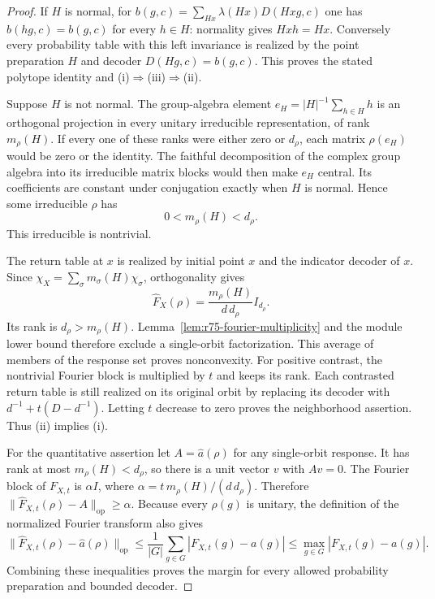 \begin{proof}
If $H$ is normal, for
$b(g,c)=\sum_{Hx}\lambda(Hx)D(Hxg,c)$ one has
$b(hg,c)=b(g,c)$ for every $h\in H$: normality gives $Hxh=Hx$.
Conversely every probability table with this left invariance is
realized by the point preparation $H$ and decoder
$D(Hg,c)=b(g,c)$. This proves the stated polytope identity and
(i)$\Rightarrow$(iii)$\Rightarrow$(ii).

Suppose $H$ is not normal. The group-algebra element
$e_H=|H|^{-1}\sum_{h\in H}h$ is an orthogonal projection in every
unitary irreducible representation, of rank $m_\rho(H)$. If every one
of these ranks were either zero or $d_\rho$, each matrix $\rho(e_H)$
would be zero or the identity. The faithful decomposition of the
complex group algebra into its irreducible matrix blocks would then
make $e_H$ central. Its coefficients are constant under conjugation
exactly when $H$ is normal. Hence some irreducible $\rho$ has
\[
 0<m_\rho(H)<d_\rho.
\]
This irreducible is nontrivial.

The return table at $x$ is realized by initial point $x$ and the
indicator decoder of $x$. Since
$\chi_X=\sum_\sigma m_\sigma(H)\chi_\sigma$, orthogonality gives
\[
 \widehat F_X(\rho)=\frac{m_\rho(H)}{d\,d_\rho}I_{d_\rho}.
\]
Its rank is $d_\rho>m_\rho(H)$. Lemma~\ref{lem:r75-fourier-multiplicity}
and the module lower bound therefore exclude a single-orbit
factorization. This average of members of the response set proves
nonconvexity. For positive contrast, the nontrivial Fourier block is
multiplied by $t$ and keeps its rank. Each contrasted return table is
still realized on its original orbit by replacing its decoder with
$d^{-1}+t(D-d^{-1})$. Letting $t$ decrease to zero proves the
neighborhood assertion. Thus (ii) implies (i).

For the quantitative assertion let $A=\widehat a(\rho)$ for any
single-orbit response. It has rank at most $m_\rho(H)<d_\rho$,
so there is a unit vector $v$ with $Av=0$. The Fourier block of
$F_{X,t}$ is $\alpha I$, where
$\alpha=t\,m_\rho(H)/(d\,d_\rho)$. Therefore
$\|\widehat F_{X,t}(\rho)-A\|_{\mathrm{op}}\ge\alpha$.
Because every $\rho(g)$ is unitary, the definition of the normalized
Fourier transform also gives
\[
 \|\widehat F_{X,t}(\rho)-\widehat a(\rho)\|_{\mathrm{op}}
 \le\frac1{|G|}\sum_{g\in G}|F_{X,t}(g)-a(g)|
 \le\max_{g\in G}|F_{X,t}(g)-a(g)|.
\]
Combining these inequalities proves the margin for every allowed
probability preparation and bounded decoder.
\end{proof}

